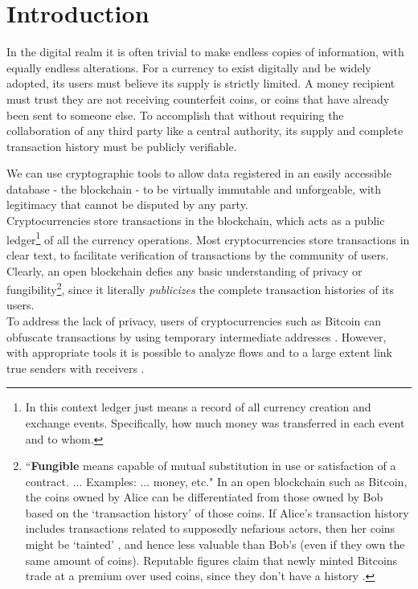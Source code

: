 \chapter{Introduction}
\label{chapter:introduction}

In the digital realm it is often trivial to make endless copies of information, with equally endless alterations. For a currency to exist digitally and be widely adopted, its users must believe its supply is strictly limited. A money recipient must trust they are not receiving counterfeit coins, or coins that have already been sent to someone else. To accomplish that without requiring the collaboration of any third party like a central authority, its supply and complete transaction history must be publicly verifiable.

We can use cryptographic tools to allow data registered in an easily accessible database - the blockchain - to be virtually immutable and unforgeable, with legitimacy that cannot be disputed by any party.
\\ \newline
Cryptocurrencies store transactions in the blockchain, which acts as a public ledger\footnote{In this context ledger just means a record of all currency creation and exchange events. Specifically, how much money was transferred in each event and to whom.} of all the currency operations. Most cryptocurrencies store transactions in clear text, to facilitate verification of transactions by the community of users.
\\ \newline
Clearly, an open blockchain defies any basic understanding of privacy or fungibility\footnote{``\textbf{Fungible} means capable of mutual substitution in use or satisfaction of a contract. ... Examples: ... money, etc."\cite{mises-org-fungible} In an open blockchain such as Bitcoin, the coins owned by Alice can be differentiated from those owned by Bob based on the `transaction history' of those coins. If Alice's transaction history includes transactions related to supposedly nefarious actors, then her coins might be `tainted' \cite{bitcoin-big-bang-taint}, and hence less valuable than Bob's (even if they own the same amount of coins). Reputable figures claim that newly minted Bitcoins trade at a premium over used coins, since they don't have a history \cite{new-bitcoin-premium}.}, since it literally {\em publicizes} the complete transaction histories of its users.
\\ \newline
To address the lack of privacy, users of cryptocurrencies such as Bitcoin can obfuscate transactions by using temporary intermediate addresses \cite{DBLP:journals/corr/NarayananM17}. However, with appropriate tools it is possible to analyze flows and to a large extent link true senders with receivers \cite{DBLP:journals/corr/ShenTuY15b, DK-police-tracing-btc, Andrew-Cox-Sandia, chainalysis-2020-report}.

